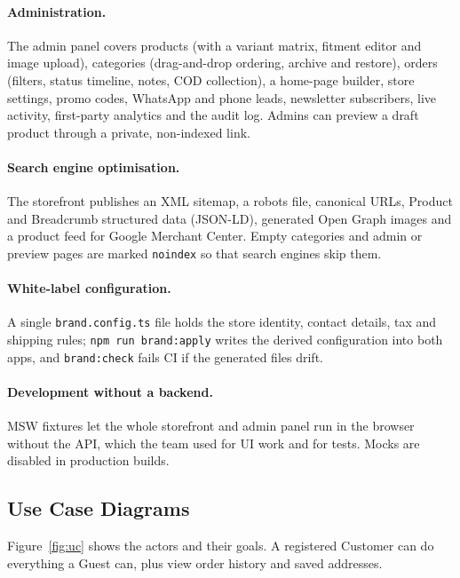 \documentclass{tietreport}
\begin{document}
\paragraph{Administration.}
The admin panel covers products (with a variant matrix, fitment editor and
image upload), categories (drag-and-drop ordering, archive and restore),
orders (filters, status timeline, notes, COD collection), a home-page
builder, store settings, promo codes, WhatsApp and phone leads, newsletter
subscribers, live activity, first-party analytics and the audit log.
Admins can preview a draft product through a private, non-indexed link.

\paragraph{Search engine optimisation.}
The storefront publishes an XML sitemap, a robots file, canonical URLs,
Product and Breadcrumb structured data (JSON-LD), generated Open Graph images
and a product feed for Google Merchant Center. Empty categories and admin or
preview pages are marked \texttt{noindex} so that search engines skip them.

\paragraph{White-label configuration.}
A single \texttt{brand.config.ts} file holds the store identity, contact
details, tax and shipping rules; \texttt{npm run brand:apply} writes the
derived configuration into both apps, and \texttt{brand:check} fails CI if
the generated files drift.

\paragraph{Development without a backend.}
MSW fixtures let the whole storefront and admin panel run in the browser
without the API, which the team used for UI work and for tests. Mocks are
disabled in production builds.

\subsection{Use Case Diagrams}

Figure~\ref{fig:uc} shows the actors and their goals. A registered Customer
can do everything a Guest can, plus view order history and saved addresses.
\end{document}
